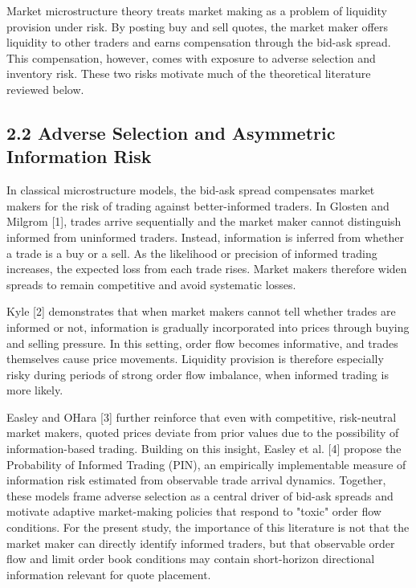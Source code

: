 \documentclass[12pt,a4paper]{article}
\begin{document}
Market microstructure theory treats market making as a problem of
liquidity provision under risk. By posting buy and sell quotes, the
market maker offers liquidity to other traders and earns compensation
through the bid-ask spread. This compensation, however, comes with
exposure to adverse selection and inventory risk. These two risks
motivate much of the theoretical literature reviewed below.

\subsection{2.2 Adverse Selection and Asymmetric Information
Risk}\label{adverse-selection-and-asymmetric-information-risk}

In classical microstructure models, the bid-ask spread compensates
market makers for the risk of trading against better-informed traders.
In Glosten and Milgrom {[}1{]}, trades arrive sequentially and the
market maker cannot distinguish informed from uninformed traders.
Instead, information is inferred from whether a trade is a buy or a
sell. As the likelihood or precision of informed trading increases, the
expected loss from each trade rises. Market makers therefore widen
spreads to remain competitive and avoid systematic losses.

Kyle {[}2{]} demonstrates that when market makers cannot tell whether
trades are informed or not, information is gradually incorporated into
prices through buying and selling pressure. In this setting, order flow
becomes informative, and trades themselves cause price movements.
Liquidity provision is therefore especially risky during periods of
strong order flow imbalance, when informed trading is more likely.

Easley and O\textquotesingle Hara {[}3{]} further reinforce that even
with competitive, risk-neutral market makers, quoted prices deviate from
prior values due to the possibility of information-based trading.
Building on this insight, Easley et al. {[}4{]} propose the Probability
of Informed Trading (PIN), an empirically implementable measure of
information risk estimated from observable trade arrival dynamics.
Together, these models frame adverse selection as a central driver of
bid-ask spreads and motivate adaptive market-making policies that
respond to "toxic" order flow conditions. For the present study, the
importance of this literature is not that the market maker can directly
identify informed traders, but that observable order flow and limit
order book conditions may contain short-horizon directional information
relevant for quote placement.
\end{document}
